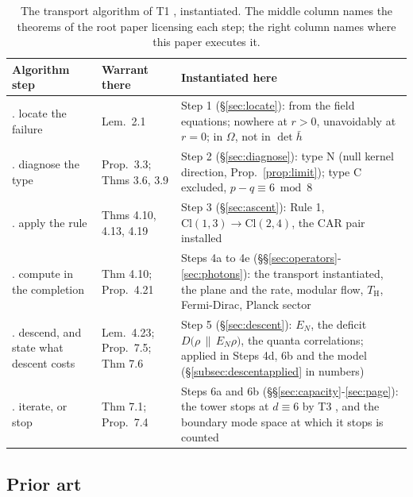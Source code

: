 \documentclass[11pt]{article}
\theoremstyle{definition}
\newcommand{\Cl}{\mathrm{Cl}}
\newcommand{\hb}{\bar{h}}
\renewcommand{\TH}{T_{\mathrm{H}}} %
\newcommand{\EN}{E_{N}}
\newcommand{\rel}[2]{D\bigl(#1 \,\|\, #2\bigr)}
\begin{document}
\begin{table}[htbp]
\centering
\footnotesize
\begin{tabular}{>{\raggedright\arraybackslash}p{2.9cm}>{\raggedright\arraybackslash}p{3.2cm}>{\raggedright\arraybackslash}p{6.6cm}}
\toprule
Algorithm step \cite[\S 8.1]{ButlerT1} & Warrant there & Instantiated here \\
\midrule
1. locate the failure & Lem.~2.1 & Step 1 (\S\ref{sec:locate}): from the field equations; nowhere at $r > 0$, unavoidably at $r = 0$; in $\Omega$, not in $\det \hb$ \\
2. diagnose the type & Prop.~3.3; Thms 3.6, 3.9 & Step 2 (\S\ref{sec:diagnose}): type N (null kernel direction, Prop.~\ref{prop:limit}); type C excluded, $p - q \equiv 6 \bmod 8$ \\
3. apply the rule & Thms 4.10, 4.13, 4.19 & Step 3 (\S\ref{sec:ascent}): Rule 1, $\Cl(1,3) \to \Cl(2,4)$, the CAR pair installed \\
4. compute in the completion & Thm 4.10; Prop.~4.21 & Steps 4a to 4e (\S\S\ref{sec:operators}-\ref{sec:photons}): the transport instantiated, the plane and the rate, modular flow, $\TH$, Fermi-Dirac, Planck sector \\
5. descend, and state what descent costs & Lem.~4.23; Prop.~7.5; Thm 7.6 & Step 5 (\S\ref{sec:descent}): $\EN$, the deficit $\rel{\rho}{\EN\rho}$, the quanta correlations; applied in Steps 4d, 6b and the model (\S\ref{subsec:descentapplied} in numbers) \\
6. iterate, or stop & Thm 7.1; Prop.~7.4 & Steps 6a and 6b (\S\S\ref{sec:capacity}-\ref{sec:page}): the tower stops at $d \equiv 6$ by T3 \cite{ButlerT3}, and the boundary mode space at which it stops is counted \\
\bottomrule
\end{tabular}
\caption{The transport algorithm of T1 \cite{ButlerT1}, instantiated. The middle column names the theorems of the root paper licensing each step; the right column names where this paper executes it.}
\label{tab:algmap}
\end{table}

\subsection*{Prior art}
\end{document}
